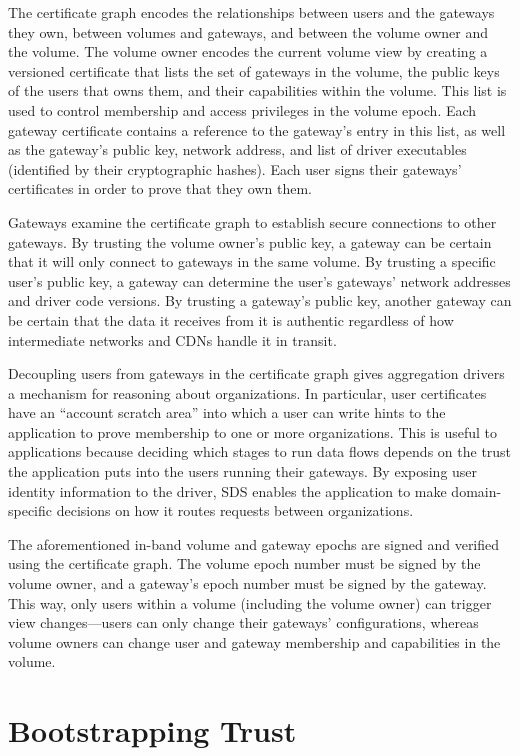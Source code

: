The certificate graph encodes the relationships between users and the gateways
they own, between volumes and gateways, and between the volume owner and the volume.
The volume owner encodes the current volume view by creating a versioned certificate that lists the set of gateways
in the volume, the public keys of the users that owns them, and their capabilities within the
volume.  This list is used to control membership and access
privileges in the volume epoch.  Each gateway certificate contains a reference to the gateway's
entry in this list, as well as the gateway's public key, network address, and list of
driver executables (identified by their cryptographic hashes).  Each user signs
their gateways' certificates in order to prove that they own them.

Gateways examine the certificate graph to establish secure connections to other
gateways.  By trusting the volume owner's public key, a gateway can be certain that it will
only connect to gateways in the same volume.  By trusting a specific user's
public key, a gateway can determine the user's gateways' network addresses and
driver code versions.  By trusting a gateway's public key, another gateway can be
certain that the data it receives from it is authentic regardless of how
intermediate networks and CDNs handle it in transit.

Decoupling users from gateways in the certificate graph gives aggregation
drivers a mechanism for reasoning about organizations.  In particular, user
certificates have an ``account scratch area'' into which a user can write hints to the
application to prove membership to one or more organizations.  This is useful
to applications because deciding which
stages to run data flows depends on the trust the application
puts into the users running their gateways.  By exposing user identity
information to the driver, SDS enables the application to make domain-specific
decisions on how it routes requests between organizations.

The aforementioned in-band volume and gateway epochs are signed and
verified using the certificate graph.  The volume epoch number must be signed by
the volume owner, and a gateway's epoch number must be signed by the gateway.
This way, only users within a volume (including the volume owner) can trigger
view changes---users can only change their gateways' configurations, whereas volume
owners can change user and gateway membership and capabilities in the volume.

\section{Bootstrapping Trust}
\label{sec:bootstrapping-trust}

